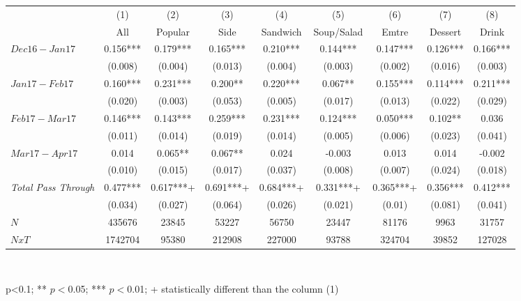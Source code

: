 \begin{center}
\begin{tabular}{lcccccccc}
\hline  & (1) & (2) & (3) & (4) & (5) & (6) & (7) & (8)\\
 & All & Popular & Side & Sandwich & Soup/Salad & Emtre & Dessert & Drink\\
\hline  $ Dec16-Jan17 $  & 0.156*** & 0.179*** & 0.165*** & 0.210*** & 0.144*** & 0.147*** & 0.126*** & 0.166***\\
 & (0.008) & (0.004) & (0.013) & (0.004) & (0.003) & (0.002) & (0.016) & (0.003)\\
 $ Jan17-Feb17 $  & 0.160*** & 0.231*** & 0.200** & 0.220*** & 0.067** & 0.155*** & 0.114*** & 0.211***\\
 & (0.020) & (0.003) & (0.053) & (0.005) & (0.017) & (0.013) & (0.022) & (0.029)\\
 $ Feb17-Mar17 $  & 0.146*** & 0.143*** & 0.259*** & 0.231*** & 0.124*** & 0.050*** & 0.102** & 0.036\\
 & (0.011) & (0.014) & (0.019) & (0.014) & (0.005) & (0.006) & (0.023) & (0.041)\\
 $ Mar17-Apr17 $  & 0.014 & 0.065** & 0.067** & 0.024 & -0.003 & 0.013 & 0.014 & -0.002\\
 & (0.010) & (0.015) & (0.017) & (0.037) & (0.008) & (0.007) & (0.024) & (0.018)\\
\hline \textit{Total Pass Through} & 0.477*** & 0.617***+ & 0.691***+ & 0.684***+ & 0.331***+ & 0.365***+ & 0.356*** & 0.412***\\
  & (0.034) & (0.027) & (0.064) & (0.026) & (0.021) & (0.01) & (0.081) & (0.041)\\
\hline  $ N $  & 435676 & 23845 & 53227 & 56750 & 23447 & 81176 & 9963 & 31757\\
 $ NxT $  & 1742704 & 95380 & 212908 & 227000 & 93788 & 324704 & 39852 & 127028\\
\hline\end{tabular}\\
\begin{tiny}p<0.1; ** $p<0$.05; *** $p<0$.01; + statistically different than the column (1)\end{tiny}\\
\end{center}
